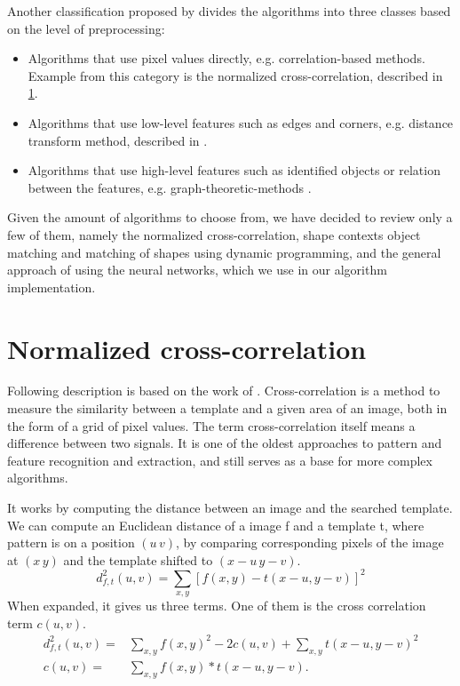 Another classification proposed by \citet{distanceTransform} divides the algorithms into three classes based on the level of preprocessing:
\begin{itemize}
\item Algorithms that use pixel values directly, e.g. correlation-based methods. Example from this category is the normalized cross-correlation, described in \cref{normalizedCC}.
\item Algorithms that use low-level features such as edges and corners, e.g. distance transform method, described in \citet{distanceTransform}.
\item Algorithms that use high-level features such as identified objects or relation between the features, e.g. graph-theoretic-methods \cite{graph}.
\end{itemize}

Given the amount of algorithms to choose from, we have decided to review only a few of them, namely the normalized cross-correlation, shape contexts object matching and matching of shapes using dynamic programming, and the general approach of using the neural networks, which we use in our algorithm implementation.

\section{Normalized cross-correlation}
\label{normalizedCC}
Following description is based on the work of \cite{crossCorrLewis}.
Cross-correlation is a method to measure the similarity between a template and a given area of an image, both in the form of a grid of pixel values. The term cross-correlation itself means a difference between two signals. It is one of the oldest approaches to pattern and feature recognition and extraction, and still serves as a base for more complex algorithms.

It works by computing the distance between an image and the searched template. We can compute an Euclidean distance of a image f and a template t, where pattern is on a position $(u\,v)$, by comparing corresponding pixels of the image at $(x\,y)$ and the template shifted to $(x-u\,y-v)$.
\[d_{f,t}^{2}(u,v)=\sum_{x,y} [ f(x,y) - t(x-u, y-v) ]^{2}\]
When expanded, it gives us three terms. One of them is the cross correlation term $c(u,v)$.
\begin{align*}
d_{f,t}^{2}(u,v)=&\sum_{x,y} f(x,y)^{2} - 2c(u,v) + \sum_{x,y} t(x-u, y-v)^2 \\
c(u,v)=&\sum_{x,y} f(x,y) * t(x-u, y-v).
\end{align*}

